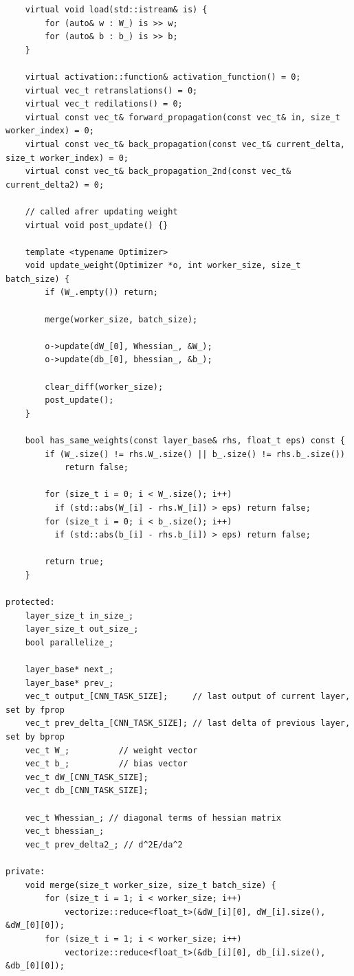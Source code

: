 \documentclass[utf8,usehyperref,14pt]{G7-32}
\begin{document}
\begin{lstlisting}
    virtual void load(std::istream& is) {
        for (auto& w : W_) is >> w;
        for (auto& b : b_) is >> b;
    }

    virtual activation::function& activation_function() = 0;
	virtual vec_t retranslations() = 0;
	virtual vec_t redilations() = 0;
    virtual const vec_t& forward_propagation(const vec_t& in, size_t worker_index) = 0;
    virtual const vec_t& back_propagation(const vec_t& current_delta, size_t worker_index) = 0;
    virtual const vec_t& back_propagation_2nd(const vec_t& current_delta2) = 0;

    // called afrer updating weight
    virtual void post_update() {}

    template <typename Optimizer>
    void update_weight(Optimizer *o, int worker_size, size_t batch_size) {
        if (W_.empty()) return;

        merge(worker_size, batch_size);

        o->update(dW_[0], Whessian_, &W_);
        o->update(db_[0], bhessian_, &b_);

        clear_diff(worker_size);
        post_update();
    }

    bool has_same_weights(const layer_base& rhs, float_t eps) const {
        if (W_.size() != rhs.W_.size() || b_.size() != rhs.b_.size())
            return false;

        for (size_t i = 0; i < W_.size(); i++)
          if (std::abs(W_[i] - rhs.W_[i]) > eps) return false;
        for (size_t i = 0; i < b_.size(); i++)
          if (std::abs(b_[i] - rhs.b_[i]) > eps) return false;

        return true;
    }

protected:
    layer_size_t in_size_;
    layer_size_t out_size_;
    bool parallelize_;

    layer_base* next_;
    layer_base* prev_;
    vec_t output_[CNN_TASK_SIZE];     // last output of current layer, set by fprop
    vec_t prev_delta_[CNN_TASK_SIZE]; // last delta of previous layer, set by bprop
    vec_t W_;          // weight vector
    vec_t b_;          // bias vector
    vec_t dW_[CNN_TASK_SIZE];
    vec_t db_[CNN_TASK_SIZE];

    vec_t Whessian_; // diagonal terms of hessian matrix
    vec_t bhessian_;
    vec_t prev_delta2_; // d^2E/da^2

private:
    void merge(size_t worker_size, size_t batch_size) {
        for (size_t i = 1; i < worker_size; i++)
            vectorize::reduce<float_t>(&dW_[i][0], dW_[i].size(), &dW_[0][0]);
        for (size_t i = 1; i < worker_size; i++)
            vectorize::reduce<float_t>(&db_[i][0], db_[i].size(), &db_[0][0]);


\end{lstlisting}
\end{document}
